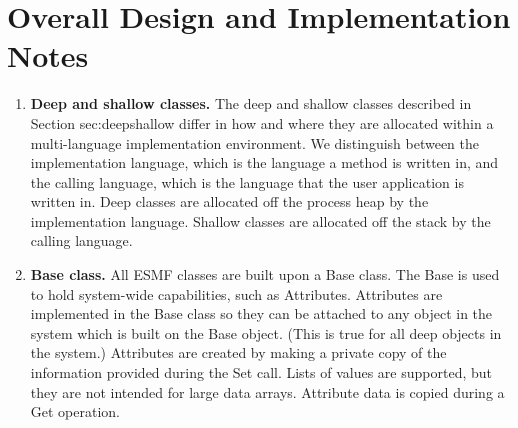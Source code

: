 
\section{Overall Design and Implementation Notes}
\label{sec:overallimpl}

\begin{enumerate}

\item {\bf Deep and shallow classes.}  The deep and shallow classes 
described in Section {sec:deepshallow} differ in how and where they
are allocated within a multi-language implementation environment.  We
distinguish between the implementation language, which is the language
a method is written in, and the calling language, which is the language
that the user application is written in.  Deep classes are allocated 
off the process heap by the implementation language.  Shallow classes
are allocated off the stack by the calling language.  

\item {\bf Base class.} All ESMF classes are built upon a Base class.  The Base 
is used to hold system-wide capabilities, such as Attributes.  Attributes 
are implemented in the Base class so they can be attached to
any object in the system which is built on the Base object.  (This is true
for all deep objects in the system.)  Attributes are created by making a
private copy of the information provided during the Set call.  Lists of
values are supported, but they are not intended for large
data arrays.   Attribute data is copied during a Get operation.

\end{enumerate}
